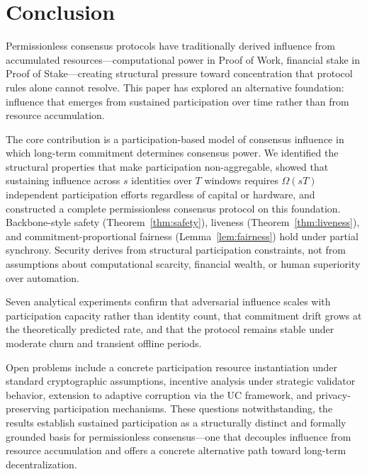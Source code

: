 \documentclass[10pt,journal,twoside]{IEEEtran}
\theoremstyle{remark}
\begin{document}
	\section{Conclusion}
	\label{sec:conclusion}
	
	Permissionless consensus protocols have traditionally
	derived influence from accumulated resources---computational
	power in Proof of Work, financial stake in Proof of
	Stake---creating structural pressure toward concentration
	that protocol rules alone cannot resolve.
	This paper has explored an alternative foundation: influence
	that emerges from sustained participation over time rather
	than from resource accumulation.
	
	The core contribution is a participation-based model of
	consensus influence in which long-term commitment
	determines consensus power.
	We identified the structural properties that make
	participation non-aggregable, showed that sustaining
	influence across $s$ identities over $T$ windows requires
	$\Omega(sT)$ independent participation efforts regardless
	of capital or hardware, and constructed a complete
	permissionless consensus protocol on this foundation.
	Backbone-style safety (Theorem~\ref{thm:safety}), liveness
	(Theorem~\ref{thm:liveness}), and commitment-proportional
	fairness (Lemma~\ref{lem:fairness}) hold under partial
	synchrony.
	Security derives from structural participation constraints,
	not from assumptions about computational scarcity,
	financial wealth, or human superiority over automation.
	
	Seven analytical experiments confirm that adversarial
	influence scales with participation capacity rather than
	identity count, that commitment drift grows at the
	theoretically predicted rate, and that the protocol
	remains stable under moderate churn and transient offline
	periods.
	
	Open problems include a concrete participation resource
	instantiation under standard cryptographic assumptions,
	incentive analysis under strategic validator behavior,
	extension to adaptive corruption via the UC framework,
	and privacy-preserving participation mechanisms.
	These questions notwithstanding, the results establish
	sustained participation as a structurally distinct and
	formally grounded basis for permissionless consensus---one
	that decouples influence from resource accumulation and
	offers a concrete alternative path toward long-term
	decentralization.
	\appendices
	
\end{document}
